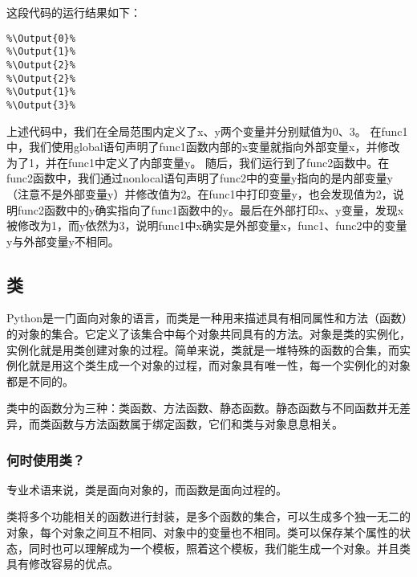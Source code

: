 这段代码的运行结果如下：
\begin{lstlisting}
%\Output{0}%
%\Output{1}%
%\Output{2}%
%\Output{2}%
%\Output{1}%
%\Output{3}%
\end{lstlisting}

上述代码中，我们在全局范围内定义了x、y两个变量并分别赋值为0、3。
在func1中，我们使用global语句声明了func1函数内部的x变量就指向外部变量x，并修改为了1，并在func1中定义了内部变量y。
随后，我们运行到了func2函数中。在func2函数中，我们通过nonlocal语句声明了func2中的变量y指向的是内部变量y（注意不是外部变量y）并修改值为2。在func1中打印变量y，也会发现值为2，说明func2函数中的y确实指向了func1函数中的y。最后在外部打印x、y变量，发现x被修改为1，而y依然为3，说明func1中x确实是外部变量x，func1、func2中的变量y与外部变量y不相同。

\subsection{类}
Python是一门面向对象的语言，而类是一种用来描述具有相同属性和方法（函数）的对象的集合。它定义了该集合中每个对象共同具有的方法。对象是类的实例化，实例化就是用类创建对象的过程。简单来说，类就是一堆特殊的函数的合集，而实例化就是用这个类生成一个对象的过程，而对象具有唯一性，每一个实例化的对象都是不同的。

类中的函数分为三种：类函数、方法函数、静态函数。静态函数与不同函数并无差异，而类函数与方法函数属于绑定函数，它们和类与对象息息相关。

\subsubsection{何时使用类？}
专业术语来说，类是面向对象的，而函数是面向过程的。

类将多个功能相关的函数进行封装，是多个函数的集合，可以生成多个独一无二的对象，每个对象之间互不相同、对象中的变量也不相同。类可以保存某个属性的状态，同时也可以理解成为一个模板，照着这个模板，我们能生成一个对象。并且类具有修改容易的优点。

